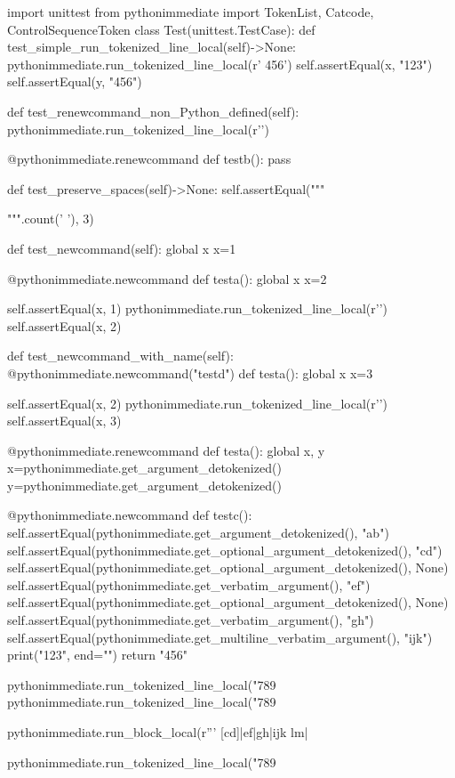 \documentclass[a5paper]{article}
\begin{document}
\begin{pycode}


import unittest
from pythonimmediate import TokenList, Catcode, ControlSequenceToken
class Test(unittest.TestCase):
	def test_simple_run_tokenized_line_local(self)->None:
		pythonimmediate.run_tokenized_line_local(r' {456}')
		self.assertEqual(x, "123")
		self.assertEqual(y, "456")

	def test_renewcommand_non_Python_defined(self):
		pythonimmediate.run_tokenized_line_local(r'\def \testb {}')

		@pythonimmediate.renewcommand
		def testb(): pass


	def test_preserve_spaces(self)->None:
		self.assertEqual("""
   
""".count(' '), 3)

	def test_newcommand(self):
		global x
		x=1

		@pythonimmediate.newcommand
		def testa():
			global x
			x=2

		self.assertEqual(x, 1)
		pythonimmediate.run_tokenized_line_local(r'\testa')
		self.assertEqual(x, 2)

	def test_newcommand_with_name(self):
		@pythonimmediate.newcommand("testd")
		def testa():
			global x
			x=3

		self.assertEqual(x, 2)
		pythonimmediate.run_tokenized_line_local(r'\testd')
		self.assertEqual(x, 3)

		@pythonimmediate.renewcommand
		def testa():
			global x, y
			x=pythonimmediate.get_argument_detokenized()
			y=pythonimmediate.get_argument_detokenized()

		@pythonimmediate.newcommand
		def testc():
			self.assertEqual(pythonimmediate.get_argument_detokenized(), "ab")
			self.assertEqual(pythonimmediate.get_optional_argument_detokenized(), "cd")
			self.assertEqual(pythonimmediate.get_optional_argument_detokenized(), None)
			self.assertEqual(pythonimmediate.get_verbatim_argument(), "ef")
			self.assertEqual(pythonimmediate.get_optional_argument_detokenized(), None)
			self.assertEqual(pythonimmediate.get_verbatim_argument(), "gh")
			self.assertEqual(pythonimmediate.get_multiline_verbatim_argument(), "ijk\nlm")
			print("123", end="")
			return "456"

		pythonimmediate.run_tokenized_line_local("789%
		pythonimmediate.run_tokenized_line_local("789%

		pythonimmediate.run_block_local(r''' [cd]|ef|{gh}|ijk
		lm|%

		pythonimmediate.run_tokenized_line_local("789%



\end{pycode}
\end{document}

